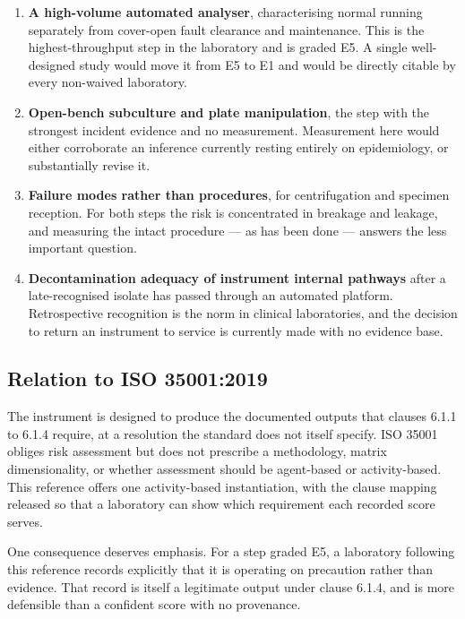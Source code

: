 \begin{enumerate}
\item \textbf{A high-volume automated analyser}, characterising normal running separately
      from cover-open fault clearance and maintenance. This is the highest-throughput step
      in the laboratory and is graded E5. A single well-designed study would move it from
      E5 to E1 and would be directly citable by every non-waived laboratory.
\item \textbf{Open-bench subculture and plate manipulation}, the step with the strongest
      incident evidence and no measurement. Measurement here would either corroborate an
      inference currently resting entirely on epidemiology, or substantially revise it.
\item \textbf{Failure modes rather than procedures}, for centrifugation and specimen
      reception. For both steps the risk is concentrated in breakage and leakage, and
      measuring the intact procedure --- as has been done --- answers the less important
      question.
\item \textbf{Decontamination adequacy of instrument internal pathways} after a
      late-recognised isolate has passed through an automated platform. Retrospective
      recognition is the norm in clinical laboratories, and the decision to return an
      instrument to service is currently made with no evidence base.
\end{enumerate}

\subsection{Relation to ISO 35001:2019}

The instrument is designed to produce the documented outputs that clauses 6.1.1 to 6.1.4
require, at a resolution the standard does not itself specify. ISO 35001 obliges risk
assessment but does not prescribe a methodology, matrix dimensionality, or whether
assessment should be agent-based or activity-based. This reference offers one
activity-based instantiation, with the clause mapping released so that a laboratory can
show which requirement each recorded score serves.

One consequence deserves emphasis. For a step graded E5, a laboratory following this
reference records explicitly that it is operating on precaution rather than evidence.
That record is itself a legitimate output under clause 6.1.4, and is more defensible than
a confident score with no provenance.

